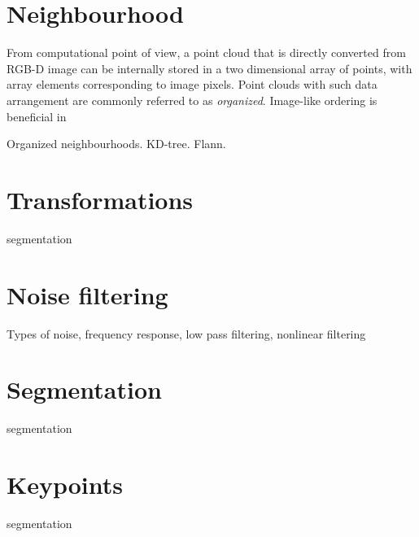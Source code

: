 
\section{Neighbourhood}
\label{sec:neighbourhood}


From computational point of view, a point cloud that is directly converted from RGB-D image can be internally stored in a two dimensional array of points, with array elements corresponding to image pixels. Point clouds with such data arrangement are commonly referred to as \textit{organized}. Image-like ordering is beneficial in 

Organized neighbourhoods.
KD-tree.
Flann.



\section{Transformations}
\label{sec:transformations}

segmentation



\section{Noise filtering}
\label{sec:segmentation}

Types of noise, frequency response, low pass filtering, nonlinear filtering


\section{Segmentation}
\label{sec:segmentation}

segmentation


\section{Keypoints}
\label{sec:keypoints}

segmentation

